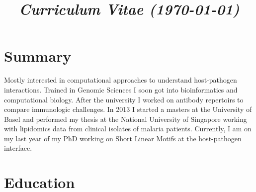 \documentclass[11pt,a4paper,sans]{moderncv} %
\title{\emph{Curriculum Vitae (\today)}}
\begin{document}
\makecvtitle %
\vspace{-1.2cm}
\section{Summary}
Mostly interested in computational approaches to understand host-pathogen interactions. Trained in Genomic Sciences I soon got into bioinformatics and computational biology. After the university I worked on antibody repertoirs to compare immunologic challenges. In 2013 I started a masters at the University of Basel and performed my thesis at the National University of Singapore working with lipidomics data from clinical isolates of malaria patients. Currently, I am on my last year of my PhD working on Short Linear Motifs at the host-pathogen interface.

\section{Education}


\end{document}

